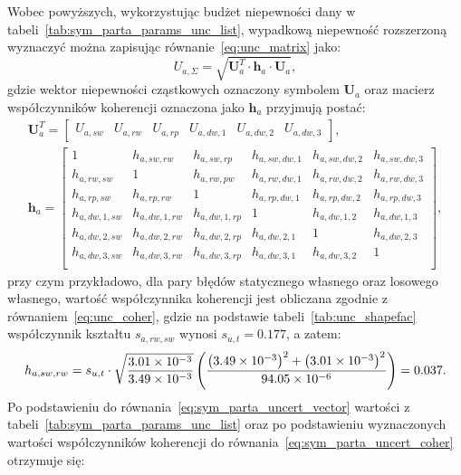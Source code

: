 Wobec powyższych, wykorzystując budżet niepewności dany w tabeli~\ref{tab:sym_parta_params_unc_list}, wypadkową niepewność rozszerzoną wyznaczyć można zapisując równanie~\eqref{eq:unc_matrix} jako:
\begin{equation}
U_{a,\Sigma} = \sqrt{\mathbf{U}_{a}^{T} \cdot \mathbf{h}_{a} \cdot \mathbf{U}_{a}} \label{eq:sym_parta_uncert_sum},
\end{equation}
gdzie wektor niepewności cząstkowych oznaczony symbolem $\mathbf{U}_{a}$ oraz macierz współczynników koherencji oznaczona jako $\mathbf{h}_{a}$ przyjmują postać:
\begin{gather}
\mathbf{U}_{a}^{T} =
\begin{bmatrix}
U_{a,sw} & U_{a,rw} & U_{a,rp} & U_{a,dw,1} & U_{a,dw,2} & U_{a,dw,3}
\end{bmatrix}
\label{eq:sym_parta_uncert_vector}, \\
\mathbf{h}_{a} =
\begin{bmatrix}
1             & h_{a,sw,rw}   & h_{a,sw,rp}   & h_{a,sw,dw,1} & h_{a,sw,dw,2} & h_{a,sw,dw,3} \\
h_{a,rw,sw}   & 1             & h_{a,rw,pw}   & h_{a,rw,dw,1} & h_{a,rw,dw,2} & h_{a,rw,dw,3} \\
h_{a,rp,sw}   & h_{a,rp,rw}   & 1             & h_{a,rp,dw,1} & h_{a,rp,dw,2} & h_{a,rp,dw,3} \\
h_{a,dw,1,sw} & h_{a,dw,1,rw} & h_{a,dw,1,rp} & 1             & h_{a,dw,1,2}  & h_{a,dw,1,3}  \\
h_{a,dw,2,sw} & h_{a,dw,2,rw} & h_{a,dw,2,rp} & h_{a,dw,2,1}  & 1             & h_{a,dw,2,3}  \\
h_{a,dw,3,sw} & h_{a,dw,3,rw} & h_{a,dw,3,rp} & h_{a,dw,3,1}  & h_{a,dw,3,2}  & 1             \\
\end{bmatrix}
\label{eq:sym_parta_uncert_coher},
\end{gather}
przy czym przykładowo, dla pary błędów statycznego własnego oraz losowego własnego, wartość współczynnika koherencji jest obliczana zgodnie z równaniem~\eqref{eq:unc_coher}, gdzie na podstawie tabeli~\ref{tab:unc_shapefac} współczynnik kształtu $s_{a,rw,sw}$ wynosi $s_{u,t} = 0.177$, a zatem:
\begin{equation}
h_{a,sw,rw} = s_{u,t} \cdot \sqrt{\frac{\num{3.01e-3}}{\num{3.49e-3}}} \left( \frac{\left(\num{3.49e-3}\right)^{2} + \left(\num{3.01e-3}\right)^{2}}{\num{94.05e-6}} \right) = 0.037 \label{eq:sym_parta_coher_sw_rw}.
\end{equation}
Po podstawieniu do równania~\eqref{eq:sym_parta_uncert_vector} wartości z tabeli~\ref{tab:sym_parta_params_unc_list} oraz po podstawieniu wyznaczonych wartości współczynników koherencji do równania~\eqref{eq:sym_parta_uncert_coher} otrzymuje się:
